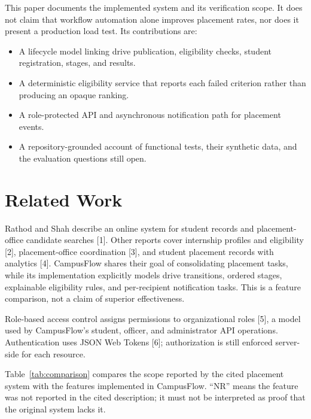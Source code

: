 \documentclass[conference,final]{IEEEtran}
\begin{document}
This paper documents the implemented system and its verification scope. It does not claim that workflow automation alone improves placement rates, nor does it present a production load test. Its contributions are:
\begin{itemize}
    \item A lifecycle model linking drive publication, eligibility checks, student registration, stages, and results.
    \item A deterministic eligibility service that reports each failed criterion rather than producing an opaque ranking.
    \item A role-protected API and asynchronous notification path for placement events.
    \item A repository-grounded account of functional tests, their synthetic data, and the evaluation questions still open.
\end{itemize}

\section{Related Work}
Rathod and Shah describe an online system for student records and placement-office candidate searches [1]. Other reports cover internship profiles and eligibility [2], placement-office coordination [3], and student placement records with analytics [4]. CampusFlow shares their goal of consolidating placement tasks, while its implementation explicitly models drive transitions, ordered stages, explainable eligibility rules, and per-recipient notification tasks. This is a feature comparison, not a claim of superior effectiveness.

Role-based access control assigns permissions to organizational roles [5], a model used by CampusFlow's student, officer, and administrator API operations. Authentication uses JSON Web Tokens [6]; authorization is still enforced server-side for each resource.

Table~\ref{tab:comparison} compares the scope reported by the cited placement system with the features implemented in CampusFlow. ``NR'' means the feature was not reported in the cited description; it must not be interpreted as proof that the original system lacks it.
\end{document}
